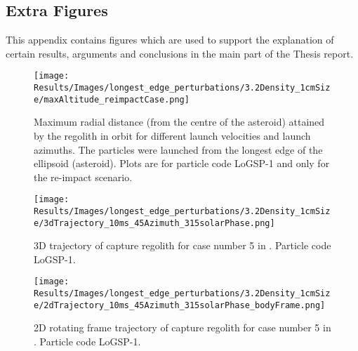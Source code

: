 \documentclass[print]{tudelft-report}
\begin{document}
\begin{appendices}
  \chapter{Extra Figures}
  This appendix contains figures which are used to support the explanation of certain results, arguments and conclusions in the main part of the Thesis report.
    \begin{figure}[htb]
    \centering
    \captionsetup{justification=centering}
    \texttt{[image: Results/Images/longest\_edge\_perturbations/3.2Density\_1cmSize/maxAltitude\_reimpactCase.png]}
    \caption{Maximum radial distance (from the centre of the asteroid) attained by the regolith in orbit for different launch velocities and launch azimuths. The particles were launched from the longest edge of the ellipsoid (asteroid). Plots are for particle code LoGSP-1 and only for the re-impact scenario.}
    \label{fig:LoGSP_1_maxAltitude_reimpactscenario}
    \end{figure}
    \FloatBarrier
    \begin{figure}[htb]
    \centering
    \captionsetup{justification=centering}
    \texttt{[image: Results/Images/longest\_edge\_perturbations/3.2Density\_1cmSize/3dTrajectory\_10ms\_45Azimuth\_315solarPhase.png]}
    \caption{3D trajectory of capture regolith for case number 5 in . Particle code LoGSP-1.}
    \label{fig:LoGSP_1_capture_case_5_3d_trajectory}
    \end{figure}
    \FloatBarrier
    \begin{figure}[htb]
    \centering
    \captionsetup{justification=centering}
    \texttt{[image: Results/Images/longest\_edge\_perturbations/3.2Density\_1cmSize/2dTrajectory\_10ms\_45Azimuth\_315solarPhase\_bodyFrame.png]}
    \caption{2D rotating frame trajectory of capture regolith for case number 5 in . Particle code LoGSP-1.}
    \label{fig:LoGSP_1_capture_case_5_2d_traj_bodyFrame}
    \end{figure}
    \FloatBarrier
    \begin{figure}[htb]
    \centering
    \captionsetup{justification=centering}

\end{figure}
\end{appendices}
\end{document}
